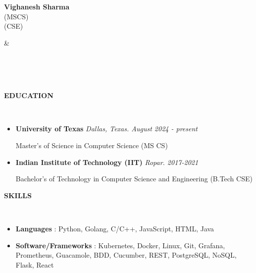 \documentclass[a4paper,10pt]{article}
\newcommand{\lsep}{-0.6cm}
\newcommand{\resheading}[1]{{\small \colorbox{mygrey}{\begin{minipage}{0.975\textwidth}{\textbf{#1 \vphantom{p\^{E}}}}\end{minipage}}}}
\begin{document}

\begin{minipage}{0.5\linewidth}
\textbf{\Large Vighanesh Sharma}\\
 (MSCS)\\
 (CSE)\\
\end{minipage}
&
\begin{minipage}{0.5\linewidth}
\\
\\
 \\
\end{minipage}

\resheading{\textbf{EDUCATION} }\\[\lsep]
\vspace{1.0pt}
\begin{itemize}
\item \textbf{University of Texas} \hfill \emph{Dallas, Texas. August 2024 - present}
\setlength{\itemsep}{1pt}
\setlength{\parskip}{0pt}
\setlength{\parsep}{0pt}

Master's of Science in Computer Science (MS CS)

\item \textbf{Indian Institute of Technology (IIT)} \hfill \emph{Ropar. 2017-2021}
\setlength{\itemsep}{1pt}
\setlength{\parskip}{0pt}
\setlength{\parsep}{0pt}

Bachelor's of Technology in Computer Science and Engineering (B.Tech CSE)

\end{itemize}

\resheading{\textbf{SKILLS} }\\[\lsep]
\vspace{1.0pt}
\begin{itemize}[itemsep=0.1pt]

\item \noindent \textbf{Languages} : Python, Golang, C/C++, JavaScript, HTML, Java
\item \noindent \textbf{Software/Frameworks} : Kubernetes, Docker, Linux, Git, Grafana, Prometheus, Guacamole, BDD, Cucumber, REST, PostgreSQL, NoSQL, Flask, React
\end{itemize}
\end{document}
